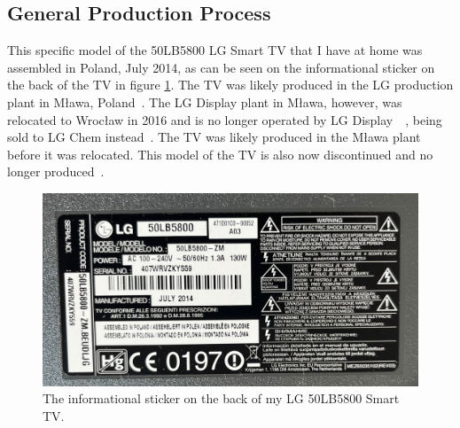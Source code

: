 \documentclass[12pt, letterpaper]{article}
\begin{document}
\subsection{General Production Process}

This specific model of the 50LB5800 LG Smart TV that I have at home
was assembled in Poland, July 2014, as can be seen on the
informational sticker on the back of the TV in figure
\ref{fig:lg-back-label}. The TV was likely produced in the LG
production plant in Mława, Poland~\autocite{lg-2020}. The LG Display
plant in Mława, however, was relocated to Wrocław in 2016 and is no
longer operated by LG
Display~\autocite{allen-2016}~\autocite{evertiq-ab-2016}, being sold
to LG Chem instead~\autocite{shah-2024}. The TV was likely produced
in the Mława plant before it was relocated. This model of the TV is
also now discontinued and no longer produced~\autocite{unknown-author-no-dateB}.

\begin{figure}[H]
  \medskip
  \centering
  \includegraphics[width=1\linewidth]{lg-back-label}
  \caption{The informational sticker on the back of my LG 50LB5800 Smart TV.}
  \medskip
  \label{fig:lg-back-label}
\end{figure}
\end{document}
